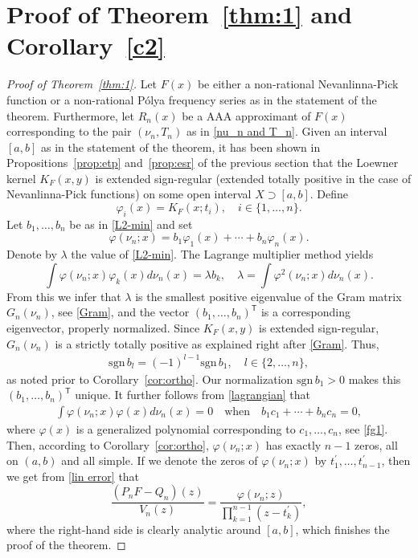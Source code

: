 \documentclass[twoside,a4paper]{amsart}
\newcommand{\sgn}{\mathrm{sgn}}
\theoremstyle{remark}
\begin{document}
\section{Proof of Theorem~\ref{thm:1} and Corollary~\ref{c2}}

\begin{proof}[Proof of Theorem~\ref{thm:1}]
Let \( F(x) \) be either a non-rational Nevanlinna-Pick function or a non-rational P\'olya frequency series as in the statement of the theorem. Furthermore, let \( R_n(x) \) be a AAA approximant of \( F(x) \) corresponding to the pair \( (\nu_n,T_n) \) as in \eqref{nu_n and T_n}. Given an interval \( [a,b] \) as in the statement of the theorem, it has been shown in Propositions~\ref{prop:etp} and~\ref{prop:esr} of the previous section that the Loewner kernel \( K_F(x,y) \) is extended sign-regular (extended totally positive in the case of Nevanlinna-Pick functions) on some open interval \( X\supset[a,b] \). Define
\[
\varphi_i(x) = K_F(x;t_i), \quad i\in\{1,\ldots,n\}.
\]
Let \( b_1,\ldots,b_n \) be as in \eqref{L2-min} and set
\[
\varphi({\nu_n};x) =  b_1 \varphi_1(x) + \cdots + b_n\varphi_n(x). 
\]
Denote by \( \lambda \) the value of \eqref{L2-min}. The Lagrange multiplier method yields
\begin{equation}
\label{lagrangian}
  \int \varphi(\nu_n;x)\varphi_k(x)d\nu_n(x)=\lambda b_k, \quad \lambda=\int\varphi^2(\nu_n;x)d\nu_n(x).
\end{equation}
From this we infer that $\lambda$ is the smallest positive eigenvalue of the Gram matrix $G_n(\nu_n)$, see \eqref{Gram}, and the vector \( (b_1,\ldots,b_n)^\mathsf{T} \) is a corresponding eigenvector, properly normalized. Since \( K_F(x,y) \) is extended sign-regular, \( G_n(\nu_n) \) is a strictly totally positive as explained right after \eqref{Gram}. Thus,
\begin{align}
\label{sign bk}
\sgn\, b_l = (-1)^{l-1} \sgn \, b_1, \quad l\in\{2,\ldots,n\},    
\end{align}
as noted prior to Corollary~\ref{cor:ortho}. Our normalization $\sgn \, b_1>0$ makes this \( (b_1,\ldots,b_n)^\mathsf{T} \) unique. It further follows from \eqref{lagrangian} that
\begin{align}
\label{orthogonality}    
\int \varphi(\nu_n;x)\varphi(x) d{\nu_n}(x) =0 \quad \text{when} \quad b_1c_1 + \cdots + b_nc_n =0,
\end{align}
where \( \varphi(x) \) is a generalized polynomial corresponding to \( c_1,\ldots,c_n \), see \eqref{fg1}. Then, according to Corollary~\ref{cor:ortho}, \( \varphi(\nu_n;x) \) has exactly \( n-1 \) zeros, all on \( (a,b) \) and all simple. If we denote the zeros of $\varphi(\nu_n;x)$ by \( t_1^\prime,\ldots,t_{n-1}^\prime \), then we get from \eqref{lin error} that
\[
\frac{(P_nF-Q_n)(z)}{V_n(z)} = \frac{\varphi(\nu_n;z)}{\prod_{k=1}^{n-1}(z-t_k^\prime)},
\]
where the right-hand side is clearly analytic around \( [a,b] \), which finishes the proof of the theorem. 
\end{proof}
\end{document}
